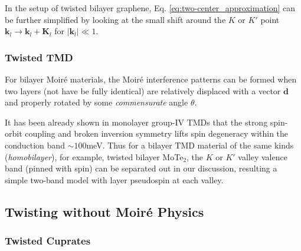 In the setup of twisted bilayer graphene, Eq. \eqref{eq:two-center_approximation} can be further simplified by looking at the small shift around the $K$ or $K'$ point $\bm k_l\rightarrow\bm k_l+\bm K_l$ for $|\bm k_l|\ll1$.



\subsubsection{Twisted TMD}
For bilayer Moir\'e materials, the Moir\'e interference patterns can be formed when two layers (not have be fully identical) are relatively displaced with a vector $\bm d$ and properly rotated by some \emph{commensurate} angle $\theta$.


It has been already shown in monolayer group-IV TMDs that the strong spin-orbit coupling and broken inversion symmetry lifts spin degeneracy within the conduction band $\sim100$meV. Thus for a bilayer TMD material of the same kinds (\emph{homobilayer}), for example, twisted bilayer MoTe$_2$, the $K$ or $K'$ valley valence band (pinned with spin) can be separated out in our discussion, resulting a simple two-band model with layer pseudospin at each valley.



\subsection{Twisting without Moir\'{e} Physics}
\subsubsection{Twisted Cuprates}
